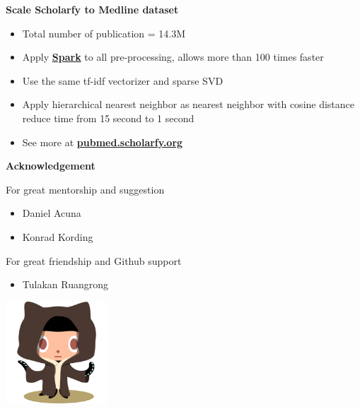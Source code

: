 \begin{frame}{\textbf{Scale Scholarfy to Medline dataset}}

\begin{itemize}
\item Total number of publication = 14.3M
\item Apply \href{http://spark.apache.org/}{\textbf{Spark}} to all pre-processing, allows more than 100 times faster
\item Use the same tf-idf vectorizer and sparse SVD
\item Apply hierarchical nearest neighbor as nearest neighbor with cosine distance reduce time from 15 second to 1 second
\item See more at \href{http://pubmed.scholarfy.net/}{\textbf{pubmed.scholarfy.org}}
\end{itemize}

\end{frame}


\begin{frame}{\textbf{Acknowledgement}}

For great mentorship and suggestion
\begin{itemize}
\item Daniel Acuna
\item Konrad Kording
\end{itemize}

For great friendship and Github support
\begin{itemize}
\item Tulakan Ruangrong
\end{itemize}

\begin{center}
\includegraphics[width=1.5in]{images/octobiwan}
\end{center}

\end{frame}


